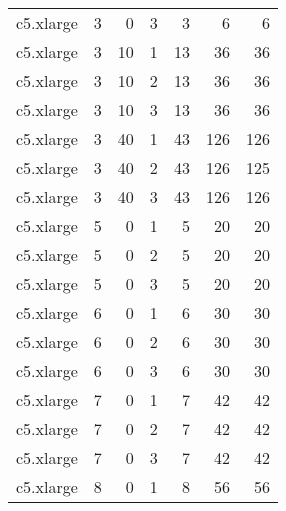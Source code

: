\begin{tabular}{lrrrrrr}
    c5.xlarge &           3 &            0 &       3 &                 3 &                    6 &                 6 \\
    c5.xlarge &           3 &           10 &       1 &                13 &                   36 &                36 \\
    c5.xlarge &           3 &           10 &       2 &                13 &                   36 &                36 \\
    c5.xlarge &           3 &           10 &       3 &                13 &                   36 &                36 \\
    c5.xlarge &           3 &           40 &       1 &                43 &                  126 &               126 \\
    c5.xlarge &           3 &           40 &       2 &                43 &                  126 &               125 \\
    c5.xlarge &           3 &           40 &       3 &                43 &                  126 &               126 \\
    c5.xlarge &           5 &            0 &       1 &                 5 &                   20 &                20 \\
    c5.xlarge &           5 &            0 &       2 &                 5 &                   20 &                20 \\
    c5.xlarge &           5 &            0 &       3 &                 5 &                   20 &                20 \\
    c5.xlarge &           6 &            0 &       1 &                 6 &                   30 &                30 \\
    c5.xlarge &           6 &            0 &       2 &                 6 &                   30 &                30 \\
    c5.xlarge &           6 &            0 &       3 &                 6 &                   30 &                30 \\
    c5.xlarge &           7 &            0 &       1 &                 7 &                   42 &                42 \\
    c5.xlarge &           7 &            0 &       2 &                 7 &                   42 &                42 \\
    c5.xlarge &           7 &            0 &       3 &                 7 &                   42 &                42 \\
    c5.xlarge &           8 &            0 &       1 &                 8 &                   56 &                56 \\

\end{tabular}
